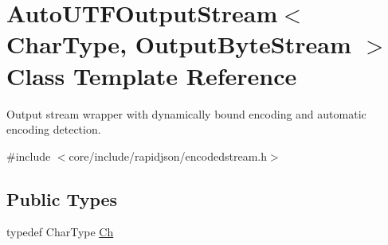 \hypertarget{classAutoUTFOutputStream}{}\section{Auto\+U\+T\+F\+Output\+Stream$<$ Char\+Type, Output\+Byte\+Stream $>$ Class Template Reference}
\label{classAutoUTFOutputStream}


Output stream wrapper with dynamically bound encoding and automatic encoding detection.  




{\ttfamily \#include $<$core/include/rapidjson/encodedstream.\+h$>$}

\subsection*{Public Types}
\begin{DoxyCompactItemize}
\item 
typedef Char\+Type \hyperlink{classAutoUTFOutputStream_abd8c486101026e11828e86c18991c9c0}{Ch}
\end{DoxyCompactItemize}
